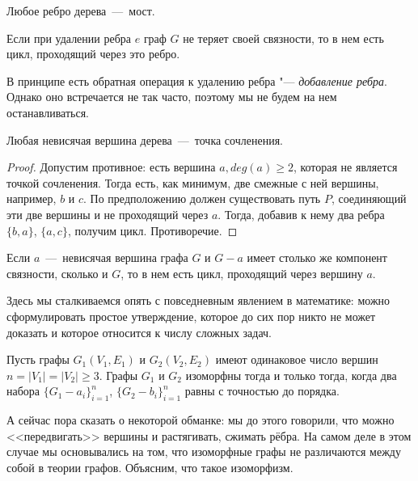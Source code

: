 \begin{consequence}
	Любое ребро дерева~---~мост.
\end{consequence}

\begin{consequence}
	Если при удалении ребра $e$ граф $G$ не теряет своей связности, то в нем есть цикл, проходящий через это ребро.
\end{consequence}

	В принципе есть обратная операция к удалению ребра "--- \emph{добавление ребра}. Однако оно встречается не так часто,
	поэтому мы не будем на нем останавливаться.

\begin{statement}
	Любая невисячая вершина дерева~---~точка сочленения.
\begin{proof}
	Допустим противное: есть вершина $a, deg(a) \geqslant 2$, которая не является точкой сочленения. Тогда есть, как минимум, 
	две смежные с ней вершины, например, $b$ и $c$. По предположению должен существовать путь $P$, соединяющий эти две вершины и 
	не проходящий через $a$. Тогда, добавив к нему два ребра $\lbrace b, a\rbrace$, $\lbrace a, c\rbrace$, получим цикл. Противоречие.
\end{proof}
\end{statement}

\begin{consequence}
	Если $a$~---~невисячая вершина графа $G$ и $G - a$ имеет столько же компонент связности, сколько и $G$, то в нем есть цикл, 
	проходящий через вершину $a$. 
\end{consequence}

	Здесь мы сталкиваемся опять с повседневным явлением в математике: можно сформулировать 
	простое утверждение, которое до сих пор никто не может доказать и которое относится к числу сложных задач.
	
\begin{hypothesis} [Улама]
	Пусть графы $G_1(V_1, E_1)$ и $G_2(V_2, E_2)$ имеют одинаковое число вершин $n = |V_1| = |V_2| \geqslant 3$.
	Графы $G_1$ и $G_2$ изоморфны тогда и только тогда, когда два набора $\lbrace G_1 - a_i\rbrace_{i=1}^{n}$,
	$\lbrace G_2 - b_i\rbrace_{i=1}^{n}$ равны с точностью до порядка.
\end{hypothesis}


	А сейчас пора сказать о некоторой обманке: мы до этого говорили, что можно <<передвигать>> 
	вершины и растягивать, сжимать рёбра. На самом деле в этом случае мы основывались на том, 
	что изоморфные графы не различаются между собой в теории графов. Объясним, что такое изоморфизм.

